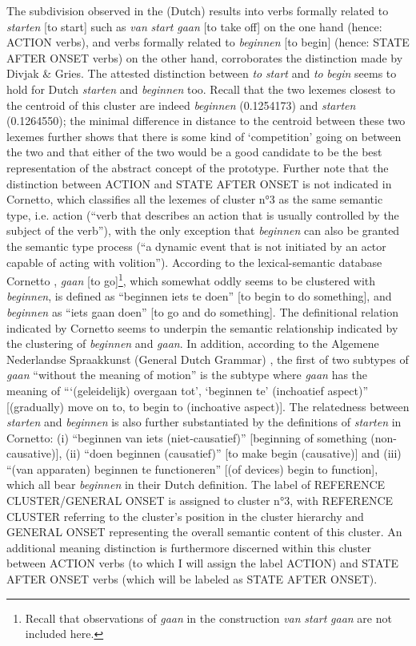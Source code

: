 The subdivision observed in the (Dutch) results into verbs formally related to \textit{starten} [to start] such as \textit{van} \textit{start} \textit{gaan} [to take off] on the one hand (hence: ACTION verbs), and verbs formally related to \textit{beginnen} [to begin] (hence: STATE AFTER ONSET verbs) on the other hand, corroborates the distinction made by Divjak \& Gries. The attested distinction between \textit{to} \textit{start} and \textit{to} \textit{begin} seems to hold for Dutch \textit{starten} and \textit{beginnen} too. Recall that the two lexemes closest to the centroid of this cluster are indeed \textit{beginnen} (0.1254173) and \textit{starten} (0.1264550); the minimal difference in distance to the centroid between these two lexemes further shows that there is some kind of ‘competition’ going on between the two and that either of the two would be a good candidate to be the best representation of the abstract concept of the prototype. Further note that the distinction between ACTION and STATE AFTER ONSET is not indicated in Cornetto, which classifies all the lexemes of cluster n°3 as the same semantic type, i.e. action (“verb that describes an action that is usually controlled by the subject of the verb”), with the only exception that \textit{beginnen} can also be granted the semantic type process (“a dynamic event that is not initiated by an actor capable of acting with volition”). According to the lexical-semantic database Cornetto \citep{vossen_cornetto_2008}, \textit{gaan} [to go]\footnote{Recall that observations of \textit{gaan} in the construction \textit{van} \textit{start} \textit{gaan} are not included here.}, which somewhat oddly seems to be clustered with \textit{beginnen}, is defined as “beginnen iets te doen” [to begin to do something], and \textit{beginnen} as “iets gaan doen” [to go and do something]. The definitional relation indicated by Cornetto seems to underpin the semantic relationship indicated by the clustering of \textit{beginnen} and \textit{gaan}. In addition, according to the Algemene Nederlandse Spraakkunst (General Dutch Grammar) \citep{haeseryn_algemene_2012}, the first of two subtypes of \textit{gaan} “without the meaning of motion” is the subtype where \textit{gaan} has the meaning of “‘(geleidelijk) overgaan tot’, ‘beginnen te’ (inchoatief aspect)” [(gradually) move on to, to begin to (inchoative aspect)]. The relatedness between \textit{starten} and \textit{beginnen} is also further substantiated by the definitions of \textit{starten} in Cornetto: (i) “beginnen van iets (niet-causatief)” [beginning of something (non-causative)], (ii) “doen beginnen (causatief)” [to make begin (causative)] and (iii) “(van apparaten) beginnen te functioneren” [(of devices) begin to function], which all bear \textit{beginnen} in their Dutch definition. The label of REFERENCE CLUSTER/GENERAL ONSET is assigned to cluster n°3, with REFERENCE CLUSTER referring to the cluster’s position in the cluster hierarchy and GENERAL ONSET representing the overall semantic content of this cluster. An additional meaning distinction is furthermore discerned within this cluster between ACTION verbs (to which I will assign the label ACTION) and STATE AFTER ONSET verbs (which will be labeled as STATE AFTER ONSET).


